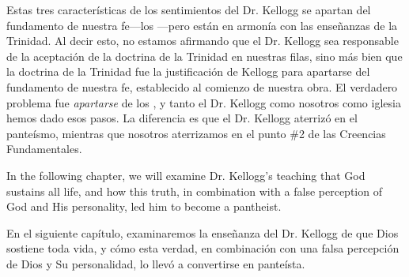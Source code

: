 Estas tres características de los sentimientos del Dr. Kellogg se apartan del fundamento de nuestra fe—los —pero están en armonía con las enseñanzas de la Trinidad. Al decir esto, no estamos afirmando que el Dr. Kellogg sea responsable de la aceptación de la doctrina de la Trinidad en nuestras filas, sino más bien que la doctrina de la Trinidad fue la justificación de Kellogg para apartarse del fundamento de nuestra fe, establecido al comienzo de nuestra obra. El verdadero problema fue \textit{apartarse} de los , y tanto el Dr. Kellogg como nosotros como iglesia hemos dado esos pasos. La diferencia es que el Dr. Kellogg aterrizó en el panteísmo, mientras que nosotros aterrizamos en el punto \#2 de las Creencias Fundamentales.


In the following chapter, we will examine Dr. Kellogg's teaching that God sustains all life, and how this truth, in combination with a false perception of God and His personality, led him to become a pantheist.


En el siguiente capítulo, examinaremos la enseñanza del Dr. Kellogg de que Dios sostiene toda vida, y cómo esta verdad, en combinación con una falsa percepción de Dios y Su personalidad, lo llevó a convertirse en panteísta.





% 
